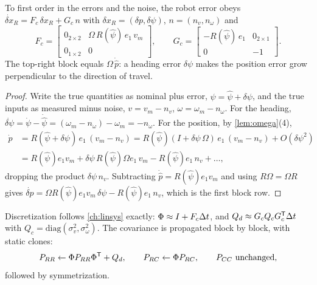 \begin{proposition}
\label{prop:planar-error}
To first order in the errors and the noise, the robot error obeys $\dot{\delta x}_R = F_c\,\delta x_R + G_c\,n$ with
$\delta x_R = (\delta p, \delta\psi)$, $n = (n_v, n_\omega)$ and
\begin{equation}
  F_c = \begin{bmatrix} 0_{2\times2} & \Omega\,R(\hat\psi)\,e_1\,v_m \\ 0_{1\times2} & 0 \end{bmatrix}, \qquad
  G_c = \begin{bmatrix} -R(\hat\psi)\,e_1 & 0_{2\times1} \\ 0 & -1 \end{bmatrix}.
  \label{eq:planar-FG}
\end{equation}
The top-right block equals $\Omega\,\dot{\hat p}$: a heading error $\delta\psi$ makes the position error grow perpendicular to the direction of travel.
\end{proposition}
\begin{proof}
Write the true quantities as nominal plus error, $\psi = \hat\psi + \delta\psi$, and the true inputs as measured minus noise,
$v = v_m - n_v$, $\omega = \omega_m - n_\omega$. For the heading, $\dot{\delta\psi} = \dot\psi - \dot{\hat\psi} = (\omega_m - n_\omega) - \omega_m = -n_\omega$.
For the position, by \cref{lem:omega}(4),
\begin{align*}
  \dot p &= R(\hat\psi + \delta\psi)\,e_1\,(v_m - n_v) = R(\hat\psi)(I + \delta\psi\,\Omega)\,e_1\,(v_m - n_v) + O(\delta\psi^2) \\
  &= R(\hat\psi)e_1v_m + \delta\psi\,R(\hat\psi)\Omega e_1\,v_m - R(\hat\psi)e_1\,n_v + \dots,
\end{align*}
dropping the product $\delta\psi\,n_v$. Subtracting $\dot{\hat p} = R(\hat\psi)e_1v_m$ and using $R\Omega = \Omega R$ gives
$\dot{\delta p} = \Omega R(\hat\psi)e_1v_m\,\delta\psi - R(\hat\psi)e_1\,n_v$, which is the first block row.
\end{proof}

Discretization follows \cref{ch:linsys} exactly: $\Phi \approx I + F_c{\Delta t}$, and $Q_d \approx G_c Q_c G_c^{\mathsf{T}}{\Delta t}$ with $Q_c = \mathrm{diag}(\sigma_v^2, \sigma_\omega^2)$.
The covariance is propagated block by block, with static clones:
\begin{equation}
  P_{RR} \gets \Phi P_{RR}\Phi^{\mathsf{T}} + Q_d, \qquad P_{RC} \gets \Phi P_{RC}, \qquad P_{CC} \text{ unchanged},
\end{equation}
followed by symmetrization.

